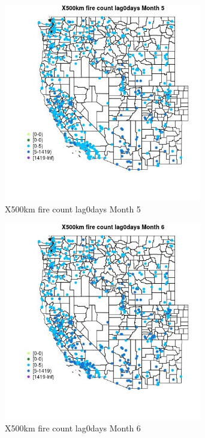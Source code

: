 \begin{figure} 
\centering  
\includegraphics[width=0.77\textwidth]{Code_Outputs/Report_ML_input_PM25_Step4_part_e_de_duplicated_aves_compiled_2019-05-14wNAs_MapObsMo5X500km_fire_count_lag0days.jpg} 
\caption{\label{fig:Report_ML_input_PM25_Step4_part_e_de_duplicated_aves_compiled_2019-05-14wNAsMapObsMo5X500km_fire_count_lag0days}X500km fire count lag0days Month 5} 
\end{figure} 
 

\begin{figure} 
\centering  
\includegraphics[width=0.77\textwidth]{Code_Outputs/Report_ML_input_PM25_Step4_part_e_de_duplicated_aves_compiled_2019-05-14wNAs_MapObsMo6X500km_fire_count_lag0days.jpg} 
\caption{\label{fig:Report_ML_input_PM25_Step4_part_e_de_duplicated_aves_compiled_2019-05-14wNAsMapObsMo6X500km_fire_count_lag0days}X500km fire count lag0days Month 6} 
\end{figure} 
 

